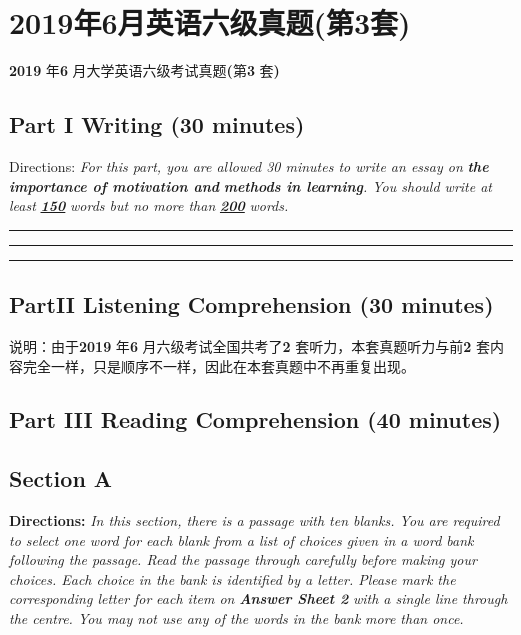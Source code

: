 \documentclass[UTF8,11pt]{ctexart}
\begin{document}
\section*{2019年6月英语六级真题(第3套)}
\textbf{2019} 年\textbf{6} 月大学英语六级考试真题\textbf{(}第\textbf{3} 套\textbf{)}


\subsection*{\textbf{Part I} \textbf{Writing} \textbf{(30 minutes)}}


Directions:\textit{ For this part, you are allowed 30 minutes to write an essay on}\textbf{\textit{ the importance of motivation and}} \textbf{\textit{methods in learning}}\textit{. You should write at least}\textbf{\textit{ }}\textbf{\textit{\uline{150}}}\textit{ words but no more than}\textbf{\textit{ }}\textbf{\textit{\uline{200}}}\textit{ words.} \par\noindent\rule{.95\linewidth}{.4pt}\par  \par\noindent\rule{.95\linewidth}{.4pt}\par  \par\noindent\rule{.95\linewidth}{.4pt}\par


\subsection*{\textbf{Part}II \textbf{Listening Comprehension} \textbf{(30 minutes)}}


说明：由于\textbf{2019} 年\textbf{6} 月六级考试全国共考了\textbf{2} 套听力，本套真题听力与前\textbf{2} 套内容完全一样，只是顺序不一样，因此在本套真题中不再重复出现。


\subsection*{\textbf{Part} III \textbf{Reading Comprehension} \textbf{(40 minutes)}}


\subsection*{\textbf{Section A}}


\textbf{Directions:}\textit{ In this section, there is a passage with ten blanks. You are required to select one word for each blank} \textit{from a list of choices given in a word bank following the passage. Read the passage through carefully before} \textit{making your choices. Each choice in the bank is identified by a letter. Please mark the corresponding letter for} \textit{each item on}\textbf{\textit{ Answer Sheet 2}}\textit{ with a single line through the centre. You may not use any of the words in the bank} \textit{more than once.}
\end{document}
